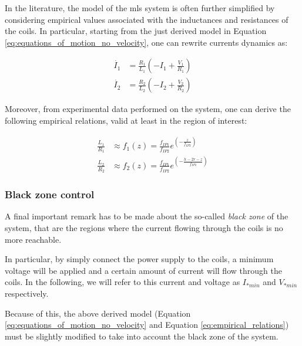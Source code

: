 In the literature, the model of the \acrshort{mls} system is often further simplified by considering empirical values associated with the inductances and resistances of the coils.
In particular, starting from the just derived model in Equation \ref{eq:equations_of_motion_no_velocity}, one can rewrite currents dynamics as:

\begin{equation}
    \begin{aligned}
        \dot{I_1} & = \frac{R_1}{L_1} \left(- I_1 + \frac{V_1}{R_1} \right) \\
        \dot{I_2} & = \frac{R_2}{L_2} \left(- I_2 + \frac{V_2}{R_2} \right)
    \end{aligned}
\end{equation}

Moreover, from experimental data performed on the system, one can derive the following empirical relations, valid at least in the region of interest:

\begin{equation}
    \begin{aligned}
        \frac{L_1}{R_1} & \approx f_1(z) = \frac{f_{IP1}}{f_{IP2}} e^{\left(-\frac{z}{f_{IP2}}\right)}          \\
        \frac{L_2}{R_2} & \approx f_2(z) = \frac{f_{IP1}}{f_{IP2}} e^{\left(-\frac{h - 2r - z}{f_{IP2}}\right)}
    \end{aligned}
    \label{eq:empirical_relations}
\end{equation}


\subsubsection{Black zone control}
\label{subsubsec:black_zone_control}

A final important remark has to be made about the so-called \textit{black zone} of the system, that are the regions where the current flowing through the coils is no more reachable.

In particular, by simply connect the power supply to the coils, a minimum voltage will be applied and a certain amount of current will flow through the coils.
In the following, we will refer to this current and voltage as $I_{*min}$ and $V_{*min}$ respectively.

Because of this, the above derived model (Equation \ref{eq:equations_of_motion_no_velocity} and Equation \ref{eq:empirical_relations}) must be slightly modified to take into account the black zone of the system.

